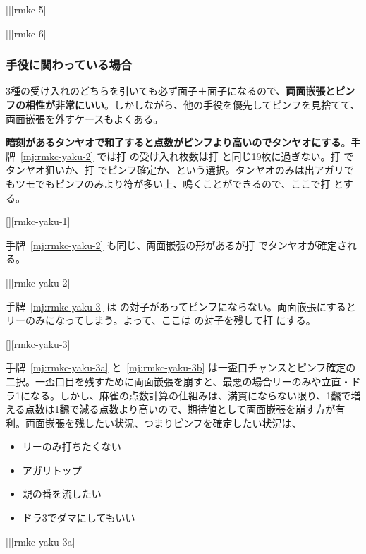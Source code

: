 \documentclass[../nankiru_main.tex]{subfiles}
\begin{document}
[][rmkc-5]

[][rmkc-6]


\subsubsection*{手役に関わっている場合}

3種の受け入れのどちらを引いても必ず面子＋面子になるので、\textbf{両面嵌張とピンフの相性が非常にいい}。しかしながら、他の手役を優先してピンフを見捨てて、両面嵌張を外すケースもよくある。

\textbf{暗刻があるタンヤオで和了すると点数がピンフより高いのでタンヤオにする}\citep[][p. 119]{uzaku-haikouritsu}。手牌~\ref{mj:rmkc-yaku-2} では打  の受け入れ枚数は打  と同じ19枚に過ぎない。打  でタンヤオ狙いか、打  でピンフ確定か、という選択。タンヤオのみは出アガリでもツモでもピンフのみより符が多い上、鳴くことができるので、ここで打  とする。

[][rmkc-yaku-1]

手牌~\ref{mj:rmkc-yaku-2} も同じ、両面嵌張の形があるが打  でタンヤオが確定される\citep[][p. 10]{uzaku-nankiru}。

[][rmkc-yaku-2]

手牌~\ref{mj:rmkc-yaku-3} は  の対子があってピンフにならない。両面嵌張にするとリーのみになってしまう。よって、ここは  の対子を残して打  にする\citep{yoteru-rmkc}。

[][rmkc-yaku-3]

手牌~\ref{mj:rmkc-yaku-3a} と~\ref{mj:rmkc-yaku-3b} は一盃口チャンスとピンフ確定の二択。一盃口目を残すために両面嵌張を崩すと、最悪の場合リーのみや立直・ドラ1になる。しかし、麻雀の点数計算の仕組みは、満貫にならない限り、1飜で増える点数は1飜で減る点数より高いので、期待値として両面嵌張を崩す方が有利。両面嵌張を残したい状況、つまりピンフを確定したい状況は、

\begin{itemize}
\item リーのみ打ちたくない
\item アガリトップ
\item 親の番を流したい
\item ドラ3でダマにしてもいい
\end{itemize}

[][rmkc-yaku-3a]
\end{document}
